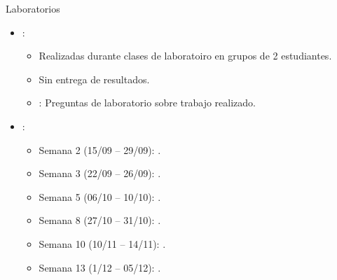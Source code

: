 \begin{frame}[t]{Laboratorios}
\begin{itemize}
  \item {}:
    \begin{itemize}
      \item Realizadas durante clases de laboratoiro en grupos de 2 estudiantes.
      \item Sin entrega de resultados.
      \item {}: Preguntas de laboratorio sobre trabajo realizado.
    \end{itemize}

  \item {}:
    \begin{itemize}
      \item Semana 2 (15/09 -- 29/09): .
      \item Semana 3 (22/09 -- 26/09): .
      \item Semana 5 (06/10 -- 10/10): .
      \item Semana 8 (27/10 -- 31/10): .
      \item Semana 10 (10/11 -- 14/11): .
      \item Semana 13 (1/12 -- 05/12): .
    \end{itemize}
\end{itemize}
\end{frame}

